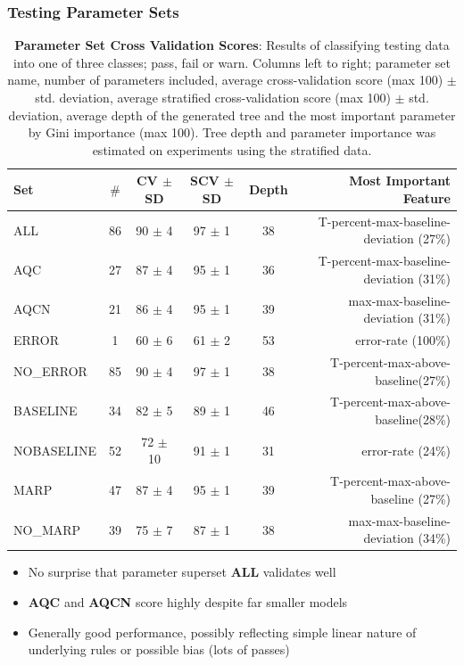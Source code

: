 \documentclass{beamer}
\begin{document}
\begin{frame}[t]
\frametitle{Testing Parameter Sets}
    \begin{table}
        \centering
        \tiny
        \begin{tabular}{l | c  c  c  c  r}
            Set           & $\#$ & CV $±$ SD & SCV $±$ SD & Depth & Most Important Feature\\
            \hline
            ALL           & 86 & 90 $±$ 4 & 97 $±$ 1 & 38 & T-percent-max-baseline-deviation (27\%)\\
            AQC           & 27 & 87 $±$ 4 & 95 $±$ 1 & 36 & T-percent-max-baseline-deviation (31\%)\\
            AQCN          & 21 & 86 $±$ 4 & 95 $±$ 1 & 39 & max-max-baseline-deviation (31\%)\\
            ERROR         & 1  & 60 $±$ 6 & 61 $±$ 2 & 53 & error-rate (100\%)\\
            NO\_ERROR     & 85 & 90 $±$ 4 & 97 $±$ 1 & 38 & T-percent-max-above-baseline(27\%)\\
            BASELINE      & 34 & 82 $±$ 5 & 89 $±$ 1 & 46 & T-percent-max-above-baseline(28\%)\\
            NOBASELINE    & 52 & 72 $±$ 10 & 91 $±$ 1 & 31 & error-rate (24\%)\\
            MARP          & 47 & 87 $±$ 4 & 95 $±$ 1 & 39 & T-percent-max-above-baseline (27\%)\\
            NO\_MARP      & 39 & 75 $±$ 7 & 87 $±$ 1 & 38 & max-max-baseline-deviation (34\%)\\
        \end{tabular}

        \caption{\tiny{\textbf{Parameter Set Cross Validation Scores}: Results of
            classifying testing data into one of three classes; pass, fail or warn.
            Columns left to right; parameter set name, number of parameters
            included, average cross-validation score (max 100) $±$ std. deviation,
            average stratified cross-validation score (max 100) $±$ std. deviation,
            average depth of the generated tree and the most important parameter by
            Gini importance (max 100). Tree depth and parameter importance was
    estimated on experiments using the stratified data.}}
    \end{table}
    \begin{itemize}
        \item No surprise that parameter superset \textbf{ALL} validates well
        \item \textbf{AQC} and \textbf{AQCN} score highly despite far smaller models
        \item Generally good performance, possibly reflecting simple linear nature
            of underlying rules or possible bias (lots of passes)
    \end{itemize}
\end{frame}
\end{document}
